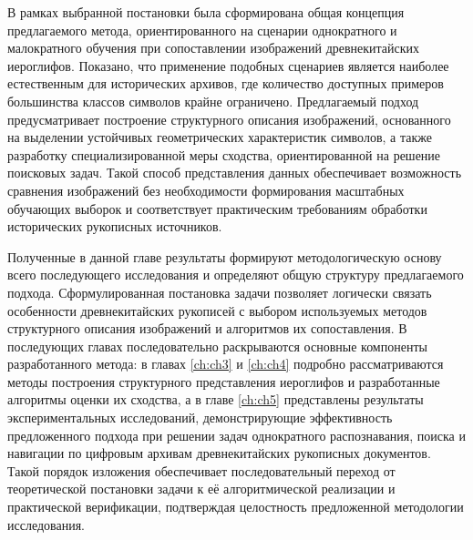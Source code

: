 В рамках выбранной постановки была сформирована общая концепция предлагаемого метода, ориентированного на сценарии однократного и малократного обучения при сопоставлении изображений древнекитайских иероглифов. Показано, что применение подобных сценариев является наиболее естественным для исторических архивов, где количество доступных примеров большинства классов символов крайне ограничено. Предлагаемый подход предусматривает построение структурного описания изображений, основанного на выделении устойчивых геометрических характеристик символов, а также разработку специализированной меры сходства, ориентированной на решение поисковых задач. Такой способ представления данных обеспечивает возможность сравнения изображений без необходимости формирования масштабных обучающих выборок и соответствует практическим требованиям обработки исторических рукописных источников.

Полученные в данной главе результаты формируют методологическую основу всего последующего исследования и определяют общую структуру предлагаемого подхода. Сформулированная постановка задачи позволяет логически связать особенности древнекитайских рукописей с выбором используемых методов структурного описания изображений и алгоритмов их сопоставления. В последующих главах последовательно раскрываются основные компоненты разработанного метода: в главах \ref{ch:ch3} и \ref{ch:ch4} подробно рассматриваются методы построения структурного представления иероглифов и разработанные алгоритмы оценки их сходства, а в главе \ref{ch:ch5} представлены результаты экспериментальных исследований, демонстрирующие эффективность предложенного подхода при решении задач однократного распознавания, поиска и навигации по цифровым архивам древнекитайских рукописных документов. Такой порядок изложения обеспечивает последовательный переход от теоретической постановки задачи к её алгоритмической реализации и практической верификации, подтверждая целостность предложенной методологии исследования.

\FloatBarrier

